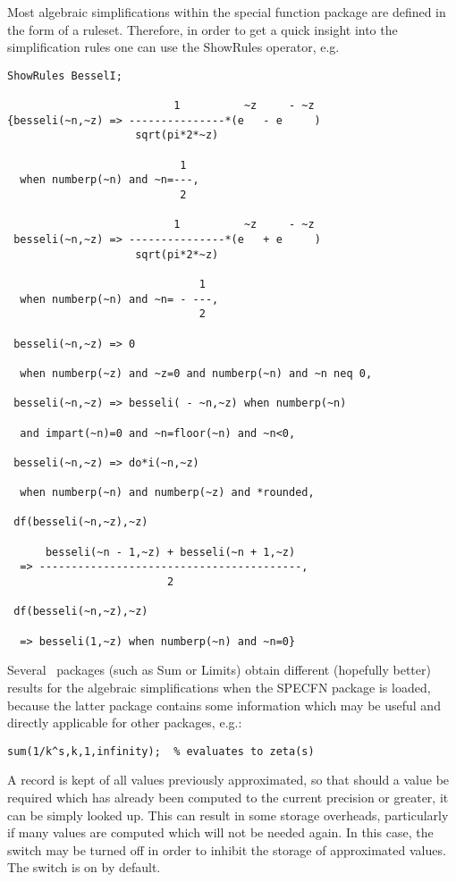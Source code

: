 Most algebraic simplifications within the special function package
are defined in the form of a \REDUCE{} ruleset. Therefore, in order to
get a quick insight into the simplification rules one can use the
ShowRules operator, e.g.
\begin{verbatim}
ShowRules BesselI;

                          1          ~z     - ~z
{besseli(~n,~z) => ---------------*(e   - e     )
                    sqrt(pi*2*~z)

                           1
  when numberp(~n) and ~n=---,
                           2

                          1          ~z     - ~z
 besseli(~n,~z) => ---------------*(e   + e     )
                    sqrt(pi*2*~z)

                              1
  when numberp(~n) and ~n= - ---,
                              2

 besseli(~n,~z) => 0

  when numberp(~z) and ~z=0 and numberp(~n) and ~n neq 0,

 besseli(~n,~z) => besseli( - ~n,~z) when numberp(~n)

  and impart(~n)=0 and ~n=floor(~n) and ~n<0,

 besseli(~n,~z) => do*i(~n,~z)

  when numberp(~n) and numberp(~z) and *rounded,

 df(besseli(~n,~z),~z)

      besseli(~n - 1,~z) + besseli(~n + 1,~z)
  => -----------------------------------------,
                         2

 df(besseli(~n,~z),~z)

  => besseli(1,~z) when numberp(~n) and ~n=0}
\end{verbatim}
Several \REDUCE\ packages (such as Sum or Limits) obtain different
(hopefully better)
results for the algebraic simplifications when the SPECFN package
is loaded, because the latter package contains some information which
may be useful and directly applicable for other packages, e.g.:

\begin{verbatim}
sum(1/k^s,k,1,infinity);  % evaluates to zeta(s)
\end{verbatim}

A record is kept of all values previously approximated, so that should a
value be required which has already been computed to the current
precision or greater, it can be simply looked up.  This can result in
some storage overheads, particularly if many values are computed which
will not be needed again.  In this case, the switch  may be
turned off in order to inhibit the storage of approximated values.  The
switch is on by default.

